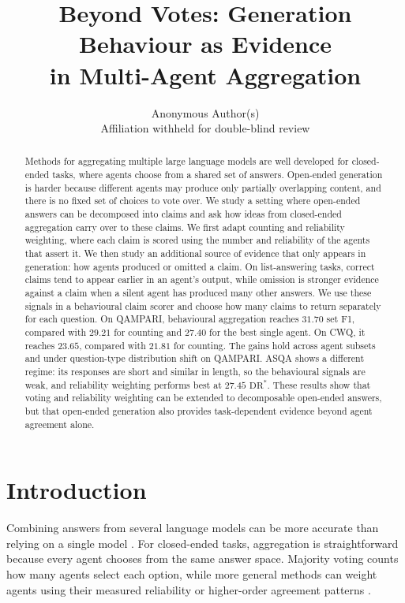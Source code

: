 \documentclass{article}
\title{Beyond Votes: Generation Behaviour as Evidence\\
in Multi-Agent Aggregation}
\author{%
  Anonymous Author(s) \\
  Affiliation withheld for double-blind review \\
}
\begin{document}
\maketitle

\begin{abstract}
Methods for aggregating multiple large language models are well developed for closed-ended tasks, where agents choose from a shared set of answers. Open-ended generation is harder because different agents may produce only partially overlapping content, and there is no fixed set of choices to vote over. We study a setting where open-ended answers can be decomposed into claims and ask how ideas from closed-ended aggregation carry over to these claims. We first adapt counting and reliability weighting, where each claim is scored using the number and reliability of the agents that assert it. We then study an additional source of evidence that only appears in generation: how agents produced or omitted a claim. On list-answering tasks, correct claims tend to appear earlier in an agent's output, while omission is stronger evidence against a claim when a silent agent has produced many other answers. We use these signals in a behavioural claim scorer and choose how many claims to return separately for each question. On QAMPARI, behavioural aggregation reaches $31.70$ set F1, compared with $29.21$ for counting and $27.40$ for the best single agent. On CWQ, it reaches $23.65$, compared with $21.81$ for counting. The gains hold across agent subsets and under question-type distribution shift on QAMPARI. ASQA shows a different regime: its responses are short and similar in length, so the behavioural signals are weak, and reliability weighting performs best at $27.45$ $\mathrm{DR}^*$. These results show that voting and reliability weighting can be extended to decomposable open-ended answers, but that open-ended generation also provides task-dependent evidence beyond agent agreement alone.
\end{abstract}

\section{Introduction}
\label{sec:intro}

Combining answers from several language models can be more accurate than relying on a single model \cite{li2024agents}. For closed-ended tasks, aggregation is straightforward because every agent chooses from the same answer space. Majority voting counts how many agents select each option, while more general methods can weight agents using their measured reliability or higher-order agreement patterns \cite{ai2025majority}.
\end{document}
